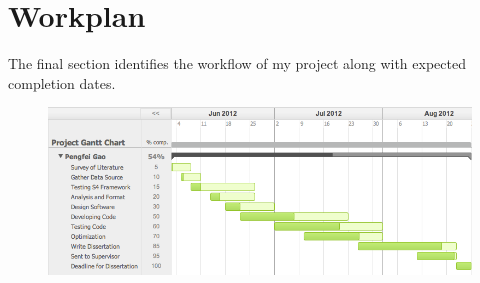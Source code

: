 \documentclass[a4paper,12pt]{article}
\begin{document}
\section{Workplan}

The final section identifies the workflow of my project along with expected completion dates. 

\begin{figure}[h]
\begin{center}
\includegraphics[scale=0.6]{gantt.png}
\end{center}
\end{figure}








\end{document}
